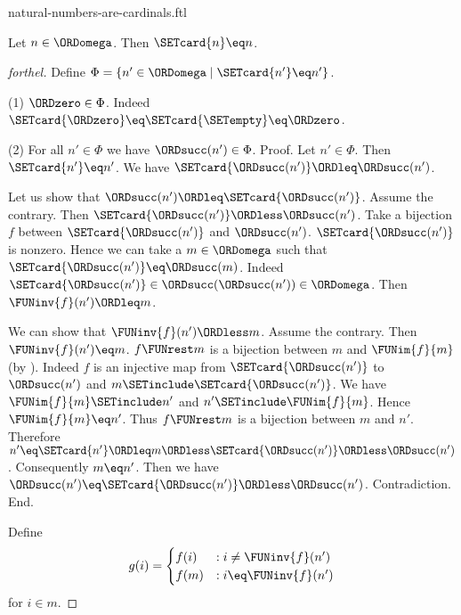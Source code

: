 \documentclass{naproche-library}
\begin{document}
\begin{smodule}[title=Natural Numbers are Cardinal Numbers]{natural-numbers-are-cardinals.ftl}

\begin{theorem}[forthel,id=SET_THEORY_07_2948332552978432]
  Let $n \in \ORDomega$.
  Then $\SETcard{n} \eq n$.
\end{theorem}
\begin{proof}[forthel]
  Define $\Phi = \{ n' \in \ORDomega \mid \SETcard{n'} \eq n' \}$.

  (1) $\ORDzero \in \Phi$.
  Indeed $\SETcard{\ORDzero} \eq \SETcard{\SETempty} \eq \ORDzero$.

  (2) For all $n' \in \Phi$ we have $\ORDsucc(n') \in \Phi$. \newline
  Proof.
    Let $n' \in \Phi$.
    Then $\SETcard{n'} \eq n'$.
    We have $\SETcard{\ORDsucc(n')} \ORDleq \ORDsucc(n')$.

    Let us show that $\ORDsucc(n') \ORDleq \SETcard{\ORDsucc(n')}$.
      Assume the contrary.
      Then $\SETcard{\ORDsucc(n')} \ORDless \ORDsucc(n')$.
      Take a bijection $f$ between $\SETcard{\ORDsucc(n')}$ and $\ORDsucc(n')$.
      $\SETcard{\ORDsucc(n')}$ is nonzero.
      Hence we can take a $m \in \ORDomega$ such that $\SETcard{\ORDsucc(n')} \eq \ORDsucc(m)$.
      Indeed $\SETcard{\ORDsucc(n')} \in \ORDsucc(\ORDsucc(n')) \in \ORDomega$.
      Then $\FUNinv{f}(n') \ORDleq m$.

      We can show that $\FUNinv{f}(n') \ORDless m$.
        Assume the contrary.
        Then $\FUNinv{f}(n') \eq m$.
        $f \FUNrest m$ is a bijection between $m$ and $\FUNim{f}{m}$ (by ).
        Indeed $f$ is an injective map from $\SETcard{\ORDsucc(n')}$ to $\ORDsucc(n')$ and
        $m \SETinclude \SETcard{\ORDsucc(n')}$.
        We have $\FUNim{f}{m} \SETinclude n'$ and $n' \SETinclude \FUNim{f}{m}$.
        Hence $\FUNim{f}{m} \eq n'$.
        Thus $f \FUNrest m$ is a bijection between $m$ and $n'$.
        Therefore $n'
          \eq \SETcard{n'}
          \ORDleq m
          \ORDless \SETcard{\ORDsucc(n')}
          \ORDless \ORDsucc(n')$.
        Consequently $m \eq n'$.
        Then we have $\ORDsucc(n') \eq \SETcard{\ORDsucc(n')} \ORDless \ORDsucc(n')$.
        Contradiction.
      End.

      Define \[ g(i) =
        \begin{cases}
          f(i)  & : i \neq \FUNinv{f}(n')
          \\
          f(m)  & : i \eq \FUNinv{f}(n')
        \end{cases} \]
      for $i \in m$.


\end{proof}
\end{smodule}
\end{document}
